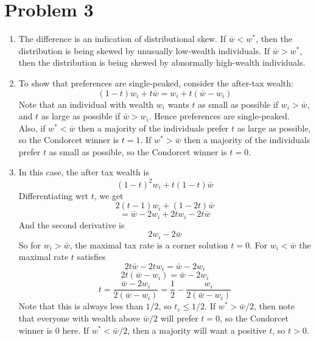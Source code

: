 \documentclass[10pt,letter]{article}
\begin{document}
\section*{Problem 3}
\begin{enumerate}[label=(\alph*)]
\item The difference is an indication of distributional skew. If $\bar{w} < w^*$, then the distribution is being skewed by unusually low-wealth individuals. If $\bar{w} > w^*$, then the distribution is being skewed by abnormally high-wealth individuals.
\item To show that preferences are single-peaked, consider the after-tax wealth:
\[ (1-t)w_i + t\bar{w} = w_i + t(\bar{w} - w_i) \]
Note that an individual with wealth $w_i$ wants $t$ as small as possible if $w_i > \bar{w}$, and $t$ as large as possible if $\bar{w} > w_i$. Hence preferences are single-peaked. Also, if $w^* < \bar{w}$  then a majority of the individuals prefer $t$ as large as possible, so the Condorcet winner is $t = 1$. If $w^* > \bar{w}$  then a majority of the individuals prefer $t$ as small as possible, so the Condorcet winner is $t = 0$.
\item In this case, the after tax wealth is
\[ (1-t)^2 w_i + t(1-t)\bar{w} \]
Differentiating wrt $t$, we get
\[ 2(t-1)w_i + (1-2t)\bar{w} \]
\[ =\bar{w} - 2 w_i + 2tw_i -2t \bar{w} \]
And the second derivative is
\[ 2w_i - 2\bar{w}  \]
So for $w_i > \bar{w}$, the maximal tax rate is a corner solution $t = 0$. For $w_i < \bar{w}$ the maximal rate $t$ satisfies
\[ 2t \bar{w}-2tw_i  =\bar{w} - 2 w_i \]
\[ 2t (\bar{w}-w_i)  =\bar{w} - 2 w_i \]
\[ t = \frac{\bar{w} - 2 w_i}{ 2(\bar{w}-w_i)} = \frac{1}{2} - \frac{w_i}{2(\bar{w}-w_i)} \]
Note that this is always less than $1/2$, so $t_c \le 1/2$. If $w^* > \bar{w}/2$, then note that everyone with wealth above $\bar{w} / 2$ will prefer $t = 0$, so the Condorcet winner is $0$ here. If $w^* < \bar{w}/2$, then a majority will want a positive $t$, so $t > 0$.
\end{enumerate}
\end{document}
